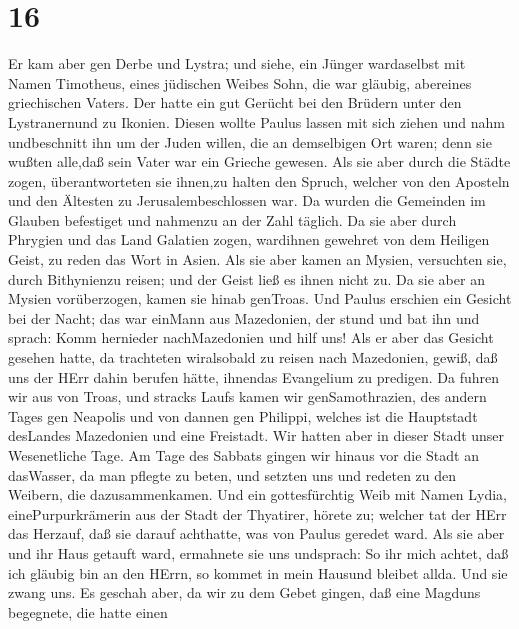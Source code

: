 \hypertarget{section-15}{%
\section{16}\label{section-15}}

 Er kam aber gen Derbe und Lystra; und siehe, ein Jünger
wardaselbst mit Namen Timotheus, eines jüdischen Weibes Sohn, die war
gläubig, abereines griechischen Vaters.  Der hatte ein gut
Gerücht bei den Brüdern unter den Lystranernund zu Ikonien. 
Diesen wollte Paulus lassen mit sich ziehen und nahm undbeschnitt ihn um
der Juden willen, die an demselbigen Ort waren; denn sie wußten alle,daß
sein Vater war ein Grieche gewesen.  Als sie aber durch die
Städte zogen, überantworteten sie ihnen,zu halten den Spruch, welcher
von den Aposteln und den Ältesten zu Jerusalembeschlossen war.
 Da wurden die Gemeinden im Glauben befestiget und nahmenzu
an der Zahl täglich.  Da sie aber durch Phrygien und das
Land Galatien zogen, wardihnen gewehret von dem Heiligen Geist, zu reden
das Wort in Asien.  Als sie aber kamen an Mysien, versuchten
sie, durch Bithynienzu reisen; und der Geist ließ es ihnen nicht zu.
 Da sie aber an Mysien vorüberzogen, kamen sie hinab
genTroas.  Und Paulus erschien ein Gesicht bei der Nacht;
das war einMann aus Mazedonien, der stund und bat ihn und sprach: Komm
hernieder nachMazedonien und hilf uns!  Als er aber das
Gesicht gesehen hatte, da trachteten wiralsobald zu reisen nach
Mazedonien, gewiß, daß uns der HErr dahin berufen hätte, ihnendas
Evangelium zu predigen.  Da fuhren wir aus von Troas, und
stracks Laufs kamen wir genSamothrazien, des andern Tages gen Neapolis
 und von dannen gen Philippi, welches ist die Hauptstadt
desLandes Mazedonien und eine Freistadt. Wir hatten aber in dieser Stadt
unser Wesenetliche Tage.  Am Tage des Sabbats gingen wir
hinaus vor die Stadt an dasWasser, da man pflegte zu beten, und setzten
uns und redeten zu den Weibern, die dazusammenkamen.  Und
ein gottesfürchtig Weib mit Namen Lydia, einePurpurkrämerin aus der
Stadt der Thyatirer, hörete zu; welcher tat der HErr das Herzauf, daß
sie darauf achthatte, was von Paulus geredet ward.  Als sie
aber und ihr Haus getauft ward, ermahnete sie uns undsprach: So ihr mich
achtet, daß ich gläubig bin an den HErrn, so kommet in mein Hausund
bleibet allda. Und sie zwang uns.  Es geschah aber, da wir
zu dem Gebet gingen, daß eine Magduns begegnete, die hatte einen
